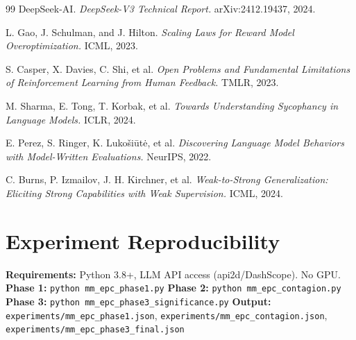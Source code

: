 \documentclass[11pt,a4paper]{article}
\begin{document}
\begin{thebibliography}{99}
 DeepSeek-AI. \textit{DeepSeek-V3 Technical Report.} arXiv:2412.19437, 2024.

 L. Gao, J. Schulman, and J. Hilton. \textit{Scaling Laws for Reward Model Overoptimization.} ICML, 2023.

 S. Casper, X. Davies, C. Shi, et al. \textit{Open Problems and Fundamental Limitations of Reinforcement Learning from Human Feedback.} TMLR, 2023.

 M. Sharma, E. Tong, T. Korbak, et al. \textit{Towards Understanding Sycophancy in Language Models.} ICLR, 2024.

 E. Perez, S. Ringer, K. Luko{\v{s}}i{\=u}t{\.e}, et al. \textit{Discovering Language Model Behaviors with Model-Written Evaluations.} NeurIPS, 2022.

 C. Burns, P. Izmailov, J. H. Kirchner, et al. \textit{Weak-to-Strong Generalization: Eliciting Strong Capabilities with Weak Supervision.} ICML, 2024.
\end{thebibliography}

\appendix
\section{Experiment Reproducibility}
\textbf{Requirements:} Python 3.8+, LLM API access (api2d/DashScope). No GPU.
\textbf{Phase 1:} \texttt{python mm\_epc\_phase1.py}
\textbf{Phase 2:} \texttt{python mm\_epc\_contagion.py}
\textbf{Phase 3:} \texttt{python mm\_epc\_phase3\_significance.py}
\textbf{Output:} \texttt{experiments/mm\_epc\_phase1.json}, \texttt{experiments/mm\_epc\_contagion.json}, \texttt{experiments/mm\_epc\_phase3\_final.json}
\end{document}
